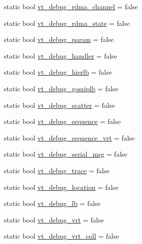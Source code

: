 \begin{DoxyCompactItemize}
\item 
static bool \hyperlink{structvt_1_1arguments_1_1_arg_config_a78388ec62b79383eacf3e48b67a47a21}{vt\+\_\+debug\+\_\+rdma\+\_\+channel} = false
\item 
static bool \hyperlink{structvt_1_1arguments_1_1_arg_config_ade199a9171a20b108af3b3631f82e5d5}{vt\+\_\+debug\+\_\+rdma\+\_\+state} = false
\item 
static bool \hyperlink{structvt_1_1arguments_1_1_arg_config_a7a9c93ea8a341a22ff4d1e58c3543d17}{vt\+\_\+debug\+\_\+param} = false
\item 
static bool \hyperlink{structvt_1_1arguments_1_1_arg_config_aa2652f92547befd3f21fa9e7bf40bf94}{vt\+\_\+debug\+\_\+handler} = false
\item 
static bool \hyperlink{structvt_1_1arguments_1_1_arg_config_a427c7fec8f7075a40014f1e6e65f849b}{vt\+\_\+debug\+\_\+hierlb} = false
\item 
static bool \hyperlink{structvt_1_1arguments_1_1_arg_config_ad7a74adc5ab27891aee08a53e0bade6a}{vt\+\_\+debug\+\_\+gossiplb} = false
\item 
static bool \hyperlink{structvt_1_1arguments_1_1_arg_config_a7f07188c6e8a456e9bfdad9ced6159df}{vt\+\_\+debug\+\_\+scatter} = false
\item 
static bool \hyperlink{structvt_1_1arguments_1_1_arg_config_a871a494f26456713e0e3a2d66d9ed08d}{vt\+\_\+debug\+\_\+sequence} = false
\item 
static bool \hyperlink{structvt_1_1arguments_1_1_arg_config_a8d2ad7c39aea97ec9679b3b660d8c017}{vt\+\_\+debug\+\_\+sequence\+\_\+vrt} = false
\item 
static bool \hyperlink{structvt_1_1arguments_1_1_arg_config_a8823380fec70a43d1179bcbbef969b1f}{vt\+\_\+debug\+\_\+serial\+\_\+msg} = false
\item 
static bool \hyperlink{structvt_1_1arguments_1_1_arg_config_a526c1e1f5819dd2296fed29673a14fbe}{vt\+\_\+debug\+\_\+trace} = false
\item 
static bool \hyperlink{structvt_1_1arguments_1_1_arg_config_a6aba4c0733b232a7bc1889e063185d75}{vt\+\_\+debug\+\_\+location} = false
\item 
static bool \hyperlink{structvt_1_1arguments_1_1_arg_config_a855ec23d7e91d2d7b6dc102c0e9f4b7a}{vt\+\_\+debug\+\_\+lb} = false
\item 
static bool \hyperlink{structvt_1_1arguments_1_1_arg_config_aa50afb2441de7797225ec882ae42ab73}{vt\+\_\+debug\+\_\+vrt} = false
\item 
static bool \hyperlink{structvt_1_1arguments_1_1_arg_config_ad5a4ae4f09e2cb77100e5622e2d5e690}{vt\+\_\+debug\+\_\+vrt\+\_\+coll} = false

\end{DoxyCompactItemize}
